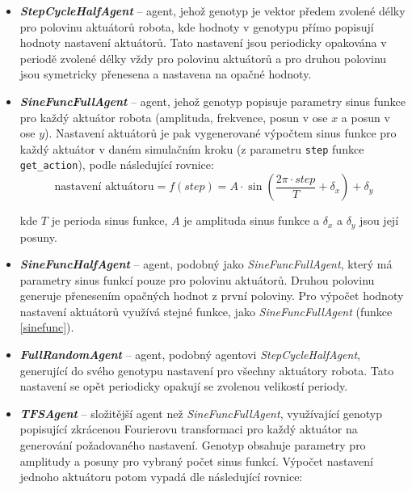 \label{imp:gaAgents.stepcyclehalfagent}
\label{imp:gaAgents.sinefuncfullagent}
\label{imp:gaAgents.sinefunchalfagent}
\label{imp:gaAgents.fullrandom}
\label{imp:gaAgents.TFSagent}
\begin{itemize}
    \item \textbf{\emph{StepCycleHalfAgent}} -- agent, jehož genotyp je vektor předem
        zvolené délky pro polovinu aktuátorů robota, kde hodnoty v genotypu přímo
        popisují hodnoty nastavení aktuátorů. Tato nastavení jsou periodicky
        opakována v periodě zvolené délky vždy pro polovinu aktuátorů a pro
        druhou polovinu jsou symetricky přenesena a nastavena na opačné
        hodnoty.
    \item \textbf{\emph{SineFuncFullAgent}} -- agent, jehož genotyp popisuje
        parametry sinus \linebreak funkce pro každý aktuátor robota (amplituda,
        frekvence, posun v ose $x$ a posun v ose $y$). Nastavení aktuátorů je
        pak vygenerované výpočtem sinus funkce pro každý aktuátor v daném
        simulačním kroku (z parametru \texttt{step} funkce
        \texttt{get\_action}), podle následující rovnice:
        \begin{equation}
            \text{nastavení aktuátoru} = f(step) = A\cdot\sin(\frac{2\pi\cdot step}{T} + \delta_x) + \delta_y
            \label{sinefunc}
        \end{equation}

        kde $T$ je perioda sinus funkce, $A$ je amplituda sinus funkce a
        $\delta_x$ a $\delta_y$ jsou její posuny.

    \item \textbf{\emph{SineFuncHalfAgent}} -- agent, podobný jako
        \emph{SineFuncFullAgent}, který má parametry sinus funkcí pouze pro
        polovinu aktuátorů. Druhou polovinu generuje přenesením opačných hodnot
        z první poloviny. Pro výpočet hodnoty nastavení aktuátorů využívá
        stejné funkce, jako \emph{SineFuncFullAgent} (funkce \ref{sinefunc}).
    \item \textbf{\emph{FullRandomAgent}} -- agent, podobný agentovi
        \emph{StepCycleHalfAgent}, generující do svého genotypu nastavení pro všechny
        aktuátory robota. Tato nastavení se opět periodicky opakují se zvolenou
        velikostí periody.
    \item \textbf{\emph{TFSAgent}} -- složitější agent než \emph{SineFuncFullAgent},
        využívající genotyp popisující zkrácenou Fourierovu transformaci pro
        každý aktuátor na generování požadovaného nastavení. Genotyp obsahuje
        parametry pro amplitudy a posuny pro vybraný počet sinus funkcí.
        Výpočet nastavení jednoho aktuátoru potom vypadá dle následující
        rovnice:


\end{itemize}
